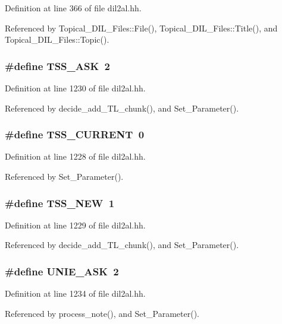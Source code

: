 Definition at line 366 of file dil2al.hh.

Referenced by Topical\_\-DIL\_\-Files::File(), Topical\_\-DIL\_\-Files::Title(), and Topical\_\-DIL\_\-Files::Topic().
\subsubsection{\setlength{\rightskip}{0pt plus 5cm}\#define TSS\_\-ASK\ 2}\label{dil2al_8hh_a81}




Definition at line 1230 of file dil2al.hh.

Referenced by decide\_\-add\_\-TL\_\-chunk(), and Set\_\-Parameter().
\subsubsection{\setlength{\rightskip}{0pt plus 5cm}\#define TSS\_\-CURRENT\ 0}\label{dil2al_8hh_a79}




Definition at line 1228 of file dil2al.hh.

Referenced by Set\_\-Parameter().
\subsubsection{\setlength{\rightskip}{0pt plus 5cm}\#define TSS\_\-NEW\ 1}\label{dil2al_8hh_a80}




Definition at line 1229 of file dil2al.hh.

Referenced by decide\_\-add\_\-TL\_\-chunk(), and Set\_\-Parameter().
\subsubsection{\setlength{\rightskip}{0pt plus 5cm}\#define UNIE\_\-ASK\ 2}\label{dil2al_8hh_a84}




Definition at line 1234 of file dil2al.hh.

Referenced by process\_\-note(), and Set\_\-Parameter().
